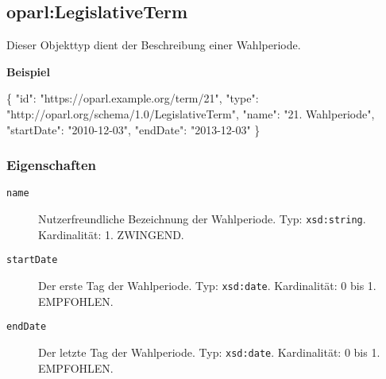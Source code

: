 \documentclass[,a4paper]{article}
\newenvironment{Shaded}{}{}
\newcommand{\DataTypeTok}[1]{\textcolor[rgb]{0.56,0.13,0.00}{{#1}}}
\newcommand{\StringTok}[1]{\textcolor[rgb]{0.25,0.44,0.63}{{#1}}}
\newcommand{\FunctionTok}[1]{\textcolor[rgb]{0.02,0.16,0.49}{{#1}}}
\begin{document}
\subsection{oparl:LegislativeTerm}\label{oparlux5flegislativeux5fterm}

Dieser Objekttyp dient der Beschreibung einer Wahlperiode.

\textbf{Beispiel}

\begin{Shaded}
\begin{Highlighting}[]
\FunctionTok{\{}
    \DataTypeTok{"id"}\FunctionTok{:} \StringTok{"https://oparl.example.org/term/21"}\FunctionTok{,}
    \DataTypeTok{"type"}\FunctionTok{:} \StringTok{"http://oparl.org/schema/1.0/LegislativeTerm"}\FunctionTok{,}
    \DataTypeTok{"name"}\FunctionTok{:} \StringTok{"21. Wahlperiode"}\FunctionTok{,}
    \DataTypeTok{"startDate"}\FunctionTok{:} \StringTok{"2010-12-03"}\FunctionTok{,}
    \DataTypeTok{"endDate"}\FunctionTok{:}  \StringTok{"2013-12-03"}
\FunctionTok{\}}
\end{Highlighting}
\end{Shaded}

\subsubsection{Eigenschaften}\label{eigenschaften-11}

\begin{description}
\item[\texttt{name}]
Nutzerfreundliche Bezeichnung der Wahlperiode. Typ: \texttt{xsd:string}.
Kardinalität: 1. ZWINGEND.
\item[\texttt{startDate}]
Der erste Tag der Wahlperiode. Typ: \texttt{xsd:date}. Kardinalität: 0
bis 1. EMPFOHLEN.
\item[\texttt{endDate}]
Der letzte Tag der Wahlperiode. Typ: \texttt{xsd:date}. Kardinalität: 0
bis 1. EMPFOHLEN.
\end{description}
\end{document}
